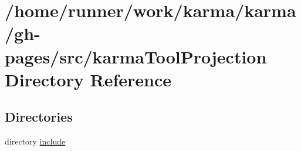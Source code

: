\section{/home/runner/work/karma/karma/gh-\/pages/src/karma\+Tool\+Projection Directory Reference}
\label{dir_41f00478989b00c299e09b5f630aa3f5}
\subsection*{Directories}
\begin{DoxyCompactItemize}
\item 
directory \hyperlink{dir_fe78f95ef73225985cbb37ca6fe2b4d3}{include}
\end{DoxyCompactItemize}
